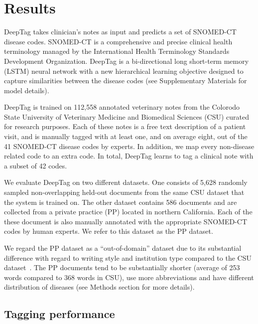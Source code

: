 \documentclass[fleqn,10pt]{wlscirep}
\begin{document}
\section*{Results}

DeepTag takes clinician's notes as input and predicts a set of SNOMED-CT disease codes. SNOMED-CT is a comprehensive and precise clinical health terminology managed by the International Health Terminology Standards Development Organization. DeepTag is a bi-directional long short-term memory (LSTM) neural network with a new hierarchical learning objective designed to
capture similarities between the disease codes (see Supplementary Materials for model details). 

DeepTag is trained on 112,558 annotated veterinary notes from the Colorodo State University of Veterinary Medicine and Biomedical Sciences (CSU) curated for research purposes. Each of these notes is a free text description of a patient visit, and is manually tagged with at least one, and on average eight, out of the 41 SNOMED-CT disease codes by experts. 
In addition, we map every non-disease related code to an extra  code. In total, DeepTag learns to tag a clinical note with a subset of 42 codes.
 
We evaluate DeepTag on two different datasets. One consists of 5,628 randomly sampled non-overlapping held-out documents from the same CSU dataset that the system is trained on. The other dataset contains 586 documents and are collected from a private practice (PP) located in northern California. Each of the these document is also manually annotated with the appropriate SNOMED-CT codes by human experts. We refer to this dataset as the PP dataset. 

We regard the PP dataset as a ``out-of-domain'' dataset due to its substantial difference with regard to writing style and institution type compared to the CSU dataset~\cite{li2012literature}. The PP documents tend to be substantially shorter (average of 253 words compared to 368 words in CSU), use more abbreviations and have different distribution of diseases (see Methods section for more details).
 
\subsection*{Tagging performance}
\end{document}
